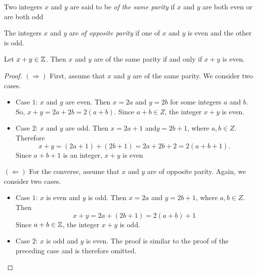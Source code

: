 \begin{defi}
    Two integers $x$ and $y$ are said to be \emph{of the same parity} if $x$ and
    $y$ are both even or are both odd
\end{defi}
\begin{defi}
    The integers $x$ and $y$ are \emph{of opposite parity}
    if one of $x$ and $y$ is even and the other is odd.
\end{defi}
\begin{thm}
    Let $x+y \in \mathbb{Z}$. Then $x$ and $y$ are of the same parity if and only if
    $x+y$ is even.
    \begin{proof}
        $(\Rightarrow)$ First, assume that $x$ and $y$ are of the same parity. We consider two
        cases.
        \begin{itemize}
             \item Case $1$: $x$ and $y$ are even. Then $x = 2a$ and $y = 2b$
             for some integers $a$ and $b$. So, $x + y = 2a + 2b = 2(a + b)$.
             Since $a + b \in Z$, the integer $x + y$ is even.
             \item Case $2$: $x$ and $y$ are odd. Then $x = 2a + 1$ and$ y = 2b + 1$,
             where $a, b \in Z$. Therefore
             \begin{equation*}
                x + y = (2a + 1) + (2b + 1) = 2a + 2b + 2 = 2(a + b + 1).
             \end{equation*}
             Since $a + b + 1$ is an integer, $x + y$ is even
        \end{itemize}
        $(\Leftarrow)$ For the converse, assume that $x$ and $y$ are of opposite parity. Again,
        we consider two cases. 
        \begin{itemize}
             \item Case $1$: $x$ is even and $y$ is odd. Then $x = 2a$ and $y = 2b + 1$,
             where $ a, b \in Z$. Then
             \begin{equation*}
                x + y = 2a + (2b + 1) = 2(a + b) + 1
             \end{equation*}
             Since $a + b \in \mathbb{Z}$, the integer $x + y$ is odd.
             \item Case $2$: $x$ is odd and $y$ is even. The proof is similar to
             the proof of the preceding case and is therefore omitted.
        \end{itemize}
    \end{proof}
\end{thm}
